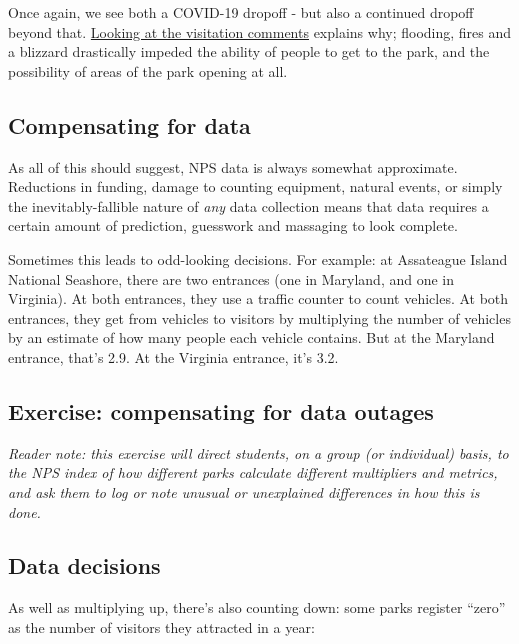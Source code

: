 \documentclass[
  letterpaper,
  DIV=11,
  numbers=noendperiod]{scrartcl}
\begin{document}
Once again, we see both a COVID-19 dropoff - but also a continued
dropoff beyond that.
\href{https://irma.nps.gov/Stats/SSRSReports/Park\%20Specific\%20Reports/Monthly\%20Visitation\%20Comments\%20By\%20Park?Park=MORA}{Looking
at the visitation comments} explains why; flooding, fires and a blizzard
drastically impeded the ability of people to get to the park, and the
possibility of areas of the park opening at all.

\subsection{Compensating for data}\label{compensating-for-data}

As all of this should suggest, NPS data is always somewhat approximate.
Reductions in funding, damage to counting equipment, natural events, or
simply the inevitably-fallible nature of \emph{any} data collection
means that data requires a certain amount of prediction, guesswork and
massaging to look complete.

Sometimes this leads to odd-looking decisions. For example: at
Assateague Island National Seashore, there are two entrances (one in
Maryland, and one in Virginia). At both entrances, they use a traffic
counter to count vehicles. At both entrances, they get from vehicles to
visitors by multiplying the number of vehicles by an estimate of how
many people each vehicle contains. But at the Maryland entrance, that's
2.9. At the Virginia entrance, it's 3.2.

\subsection{Exercise: compensating for data
outages}\label{exercise-compensating-for-data-outages}

\emph{Reader note: this exercise will direct students, on a group (or
individual) basis, to the NPS index of how different parks calculate
different multipliers and metrics, and ask them to log or note unusual
or unexplained differences in how this is done.}

\subsection{Data decisions}\label{data-decisions}

As well as multiplying up, there's also counting down: some parks
register ``zero'' as the number of visitors they attracted in a year:
\end{document}
